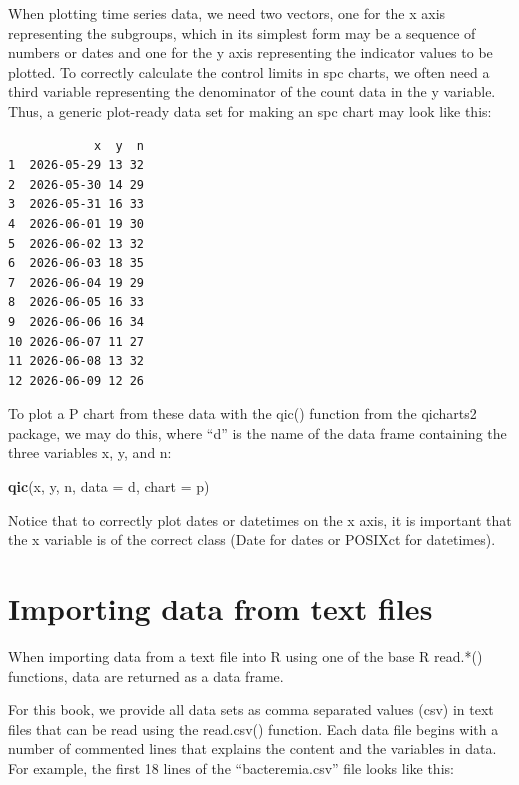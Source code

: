 \documentclass[
]{book}
\makeatletter
\newenvironment{Shaded}{\begin{snugshade}}{\end{snugshade}}
\newcommand{\AttributeTok}[1]{\textcolor[rgb]{0.13,0.29,0.53}{#1}}
\newcommand{\FunctionTok}[1]{\textcolor[rgb]{0.13,0.29,0.53}{\textbf{#1}}}
\newcommand{\NormalTok}[1]{#1}
\newcommand{\StringTok}[1]{\textcolor[rgb]{0.31,0.60,0.02}{#1}}
\newcommand*\pandocbounded[1]{%
  \sbox\pandoc@box{#1}%
  \Gscale@div\@tempa{\textheight}{\dimexpr\ht\pandoc@box+\dp\pandoc@box\relax}%
  \Gscale@div\@tempb{\linewidth}{\wd\pandoc@box}%
  \ifdim\@tempb\p@<\@tempa\p@\let\@tempa\@tempb\fi%
  \ifdim\@tempa\p@<\p@\scalebox{\@tempa}{\usebox\pandoc@box}%
  \else\usebox{\pandoc@box}%
  \fi%
}
\makeatother
\begin{document}
When plotting time series data, we need two vectors, one for the x axis
representing the subgroups, which in its simplest form may be a sequence
of numbers or dates and one for the y axis representing the indicator
values to be plotted. To correctly calculate the control limits in spc
charts, we often need a third variable representing the denominator of
the count data in the y variable. Thus, a generic plot-ready data set
for making an spc chart may look like this:

\begin{verbatim}
            x  y  n
1  2026-05-29 13 32
2  2026-05-30 14 29
3  2026-05-31 16 33
4  2026-06-01 19 30
5  2026-06-02 13 32
6  2026-06-03 18 35
7  2026-06-04 19 29
8  2026-06-05 16 33
9  2026-06-06 16 34
10 2026-06-07 11 27
11 2026-06-08 13 32
12 2026-06-09 12 26
\end{verbatim}

To plot a P chart from these data with the qic() function from the
qicharts2 package, we may do this, where ``d'' is the name of the data
frame containing the three variables x, y, and n:

\begin{Shaded}
\begin{Highlighting}[]
\FunctionTok{qic}\NormalTok{(x, y, n, }
    \AttributeTok{data  =}\NormalTok{ d, }
    \AttributeTok{chart =} \StringTok{\textquotesingle{}p\textquotesingle{}}\NormalTok{)}
\end{Highlighting}
\end{Shaded}

\pandocbounded{}

Notice that to correctly plot dates or datetimes on the x axis, it is
important that the x variable is of the correct class (Date for dates or
POSIXct for datetimes).

\section{Importing data from text
files}\label{importing-data-from-text-files}

When importing data from a text file into R using one of the base R
read.*() functions, data are returned as a data frame.

For this book, we provide all data sets as comma separated values (csv)
in text files that can be read using the read.csv() function. Each data
file begins with a number of commented lines that explains the content
and the variables in data. For example, the first 18 lines of the
``bacteremia.csv'' file looks like this:
\end{document}
